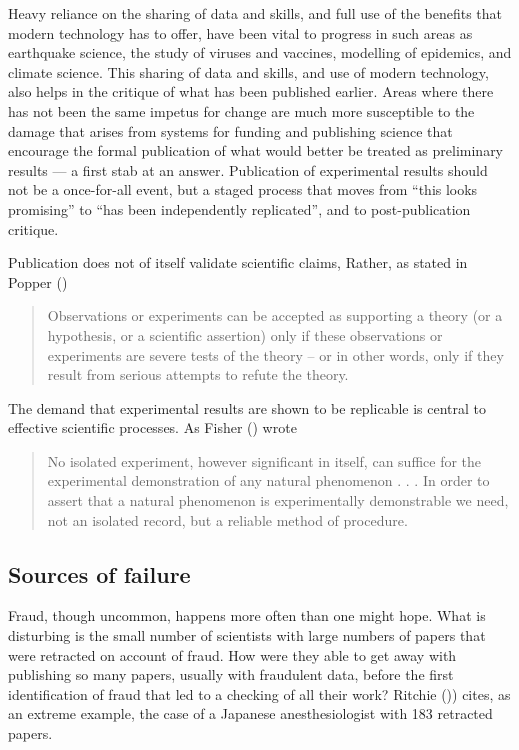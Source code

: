 \documentclass[
  10ptls,
  b5paper]{book}
\begin{document}
Heavy reliance on the sharing of data and skills, and full use of
the benefits that modern technology has to offer, have been vital
to progress in such areas as earthquake science, the study of
viruses and vaccines, modelling of epidemics, and climate science.
This sharing of data and skills, and use of modern technology, also
helps in the critique of what has been published earlier.
Areas where there has not been the same impetus for change are much
more susceptible to the damage that arises from systems for funding
and publishing science that encourage the formal publication of
what would better be treated as preliminary results --- a first
stab at an answer. Publication of experimental results should not
be a once-for-all event, but a staged process that moves from
``this looks promising'' to ``has been independently replicated'',
and to post-publication critique.

Publication does not of itself validate scientific claims,
Rather, as stated in Popper ()

\begin{quote}
Observations or experiments can be accepted as supporting a theory (or a hypothesis, or a scientific assertion) only if these observations or experiments are severe tests of the theory -- or in other words, only if they result from serious attempts to refute the theory.
\end{quote}

The demand that experimental results are shown to be replicable is
central to effective scientific processes. As Fisher () wrote

\begin{quote}
No isolated experiment, however significant in itself, can suffice for the experimental demonstration of any natural phenomenon . . . In order to assert that a natural phenomenon is experimentally demonstrable we need, not an isolated record, but a reliable method of procedure.
\end{quote}

\subsection*{Sources of failure}\label{sources-of-failure}

Fraud, though uncommon, happens more often than one might hope.
What is disturbing is the small number of scientists with
large numbers of papers that were retracted on account of
fraud. How were they able to get away with publishing so
many papers, usually with fraudulent data, before the
first identification of fraud that led to a checking of all
their work? Ritchie ()) cites,
as an extreme example, the case of a Japanese anesthesiologist
with 183 retracted papers.
\end{document}
